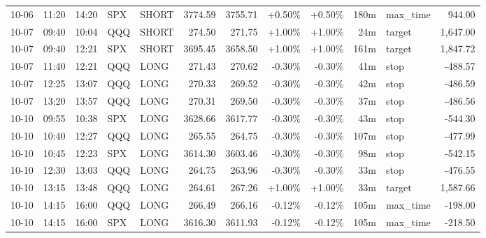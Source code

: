 \documentclass[11pt,a4paper,twoside]{article}
\begin{document}
\begin{center}
\begin{longtable}{>{\color{txtmain}}l l l l l r r r r r >{\color{txtmain}}l r}
10-06 & 11:20 & 14:20 & SPX & SHORT & 3774.59 & 3755.71 & \textcolor{wingreen}{+0.50\%} & \textcolor{wingreen}{+0.50\%} & 180m & max\_time & \textcolor{wingreen}{944.00} \\
10-07 & 09:40 & 10:04 & QQQ & SHORT & 274.50 & 271.75 & \textcolor{wingreen}{+1.00\%} & \textcolor{wingreen}{+1.00\%} & 24m & target & \textcolor{wingreen}{1,647.00} \\
10-07 & 09:40 & 12:21 & SPX & SHORT & 3695.45 & 3658.50 & \textcolor{wingreen}{+1.00\%} & \textcolor{wingreen}{+1.00\%} & 161m & target & \textcolor{wingreen}{1,847.72} \\
10-07 & 11:40 & 12:21 & QQQ & LONG & 271.43 & 270.62 & \textcolor{lossred}{-0.30\%} & \textcolor{lossred}{-0.30\%} & 41m & stop & \textcolor{lossred}{-488.57} \\
10-07 & 12:25 & 13:07 & QQQ & LONG & 270.33 & 269.52 & \textcolor{lossred}{-0.30\%} & \textcolor{lossred}{-0.30\%} & 42m & stop & \textcolor{lossred}{-486.59} \\
10-07 & 13:20 & 13:57 & QQQ & LONG & 270.31 & 269.50 & \textcolor{lossred}{-0.30\%} & \textcolor{lossred}{-0.30\%} & 37m & stop & \textcolor{lossred}{-486.56} \\
10-10 & 09:55 & 10:38 & SPX & LONG & 3628.66 & 3617.77 & \textcolor{lossred}{-0.30\%} & \textcolor{lossred}{-0.30\%} & 43m & stop & \textcolor{lossred}{-544.30} \\
10-10 & 10:40 & 12:27 & QQQ & LONG & 265.55 & 264.75 & \textcolor{lossred}{-0.30\%} & \textcolor{lossred}{-0.30\%} & 107m & stop & \textcolor{lossred}{-477.99} \\
10-10 & 10:45 & 12:23 & SPX & LONG & 3614.30 & 3603.46 & \textcolor{lossred}{-0.30\%} & \textcolor{lossred}{-0.30\%} & 98m & stop & \textcolor{lossred}{-542.15} \\
10-10 & 12:30 & 13:03 & QQQ & LONG & 264.75 & 263.96 & \textcolor{lossred}{-0.30\%} & \textcolor{lossred}{-0.30\%} & 33m & stop & \textcolor{lossred}{-476.55} \\
10-10 & 13:15 & 13:48 & QQQ & LONG & 264.61 & 267.26 & \textcolor{wingreen}{+1.00\%} & \textcolor{wingreen}{+1.00\%} & 33m & target & \textcolor{wingreen}{1,587.66} \\
10-10 & 14:15 & 16:00 & QQQ & LONG & 266.49 & 266.16 & \textcolor{lossred}{-0.12\%} & \textcolor{lossred}{-0.12\%} & 105m & max\_time & \textcolor{lossred}{-198.00} \\
10-10 & 14:15 & 16:00 & SPX & LONG & 3616.30 & 3611.93 & \textcolor{lossred}{-0.12\%} & \textcolor{lossred}{-0.12\%} & 105m & max\_time & \textcolor{lossred}{-218.50} \\

\end{longtable}
\end{center}
\end{document}

